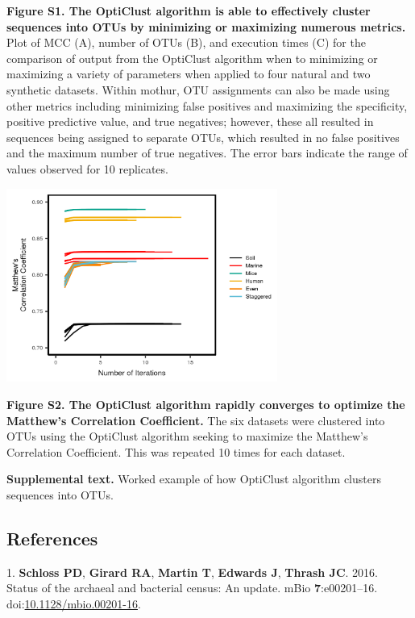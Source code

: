 \documentclass[11pt,]{article}
\begin{document}
\textbf{Figure S1. The OptiClust algorithm is able to effectively
cluster sequences into OTUs by minimizing or maximizing numerous
metrics.} Plot of MCC (A), number of OTUs (B), and execution times (C)
for the comparison of output from the OptiClust algorithm when to
minimizing or maximizing a variety of parameters when applied to four
natural and two synthetic datasets. Within mothur, OTU assignments can
also be made using other metrics including minimizing false positives
and maximizing the specificity, positive predictive value, and true
negatives; however, these all resulted in sequences being assigned to
separate OTUs, which resulted in no false positives and the maximum
number of true negatives. The error bars indicate the range of values
observed for 10 replicates.

\newpage

\includegraphics[width=3.5in]{../results/figures/optimization.png}

\textbf{Figure S2. The OptiClust algorithm rapidly converges to optimize
the Matthew's Correlation Coefficient.} The six datasets were clustered
into OTUs using the OptiClust algorithm seeking to maximize the
Matthew's Correlation Coefficient. This was repeated 10 times for each
dataset.

\newpage

\textbf{Supplemental text.} Worked example of how OptiClust algorithm
clusters sequences into OTUs.

\newpage

\subsection*{References}\label{references}

\hypertarget{refs}{}
\hypertarget{ref-Schloss2016b}{}
1. \textbf{Schloss PD}, \textbf{Girard RA}, \textbf{Martin T},
\textbf{Edwards J}, \textbf{Thrash JC}. 2016. Status of the archaeal and
bacterial census: An update. mBio \textbf{7}:e00201--16.
doi:\href{https://doi.org/10.1128/mbio.00201-16}{10.1128/mbio.00201-16}.
\end{document}
